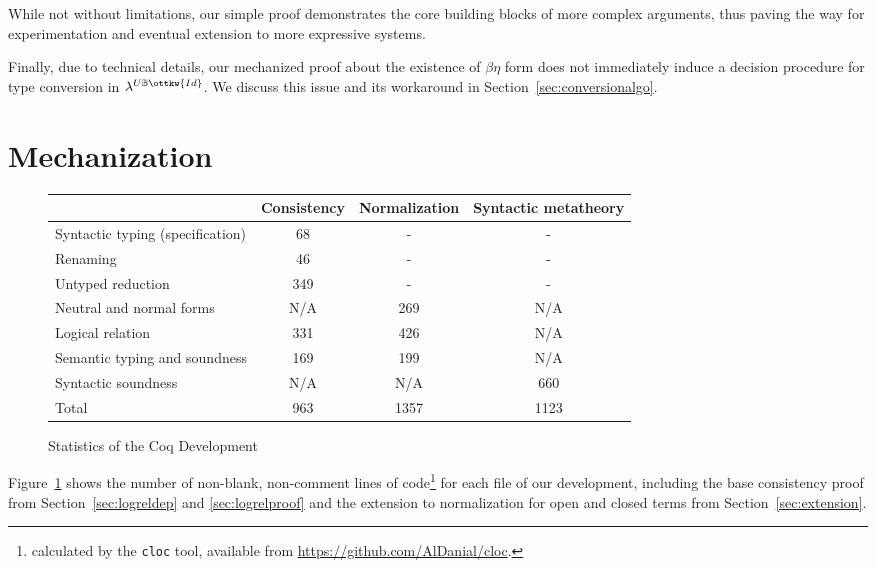 \documentclass[acmsmall,screen=true,
\ifpublic review=false\else,review=true\fi
  ,anonymous=\ifanonymous true\else false\fi]{acmart}
\newcommand{\lang}{$\lambda^{U\mathbb{B}\ottkw{Id}}$\xspace}
\newcommand{\scw}[1]{}
\begin{document}
While not without limitations, our simple proof demonstrates the core
building blocks of more complex arguments, thus paving the way for experimentation
and eventual extension to more expressive systems.\scw{I tried to reword your
sentence, but I am still not happy with it.}

\scw{Is this specific to $\eta$? Or is this also true for $\beta$? Can we move this
sentence elsewhere? I'd like to use the previous sentence as a conclusion for
this section.}
Finally, due to technical
details, our mechanized proof about the existence of $\beta\eta$ form does not
immediately induce a decision procedure for type conversion in
\lang{}. We discuss this issue and its workaround in
Section~\ref{sec:conversionalgo}.
\section{Mechanization}
\label{sec:logrelmech}
\begin{figure}[h]
  \begin{minipage}{0.9\textwidth}
  \begin{tabular}{ l |  c  | c | c }
    & Consistency & Normalization & Syntactic metatheory \\
    \hline
    Syntactic typing (specification) &  68 & - & - \\
    Renaming & 46 & -  & - \\
    Untyped reduction & 349 & - & - \\
    Neutral and normal forms & N/A & 269 & N/A \\
    Logical relation & 331 & 426 & N/A \\
    Semantic typing and soundness & 169 & 199 & N/A \\
    Syntactic soundness & N/A & N/A  & 660 \\
    \hline
    Total & 963 & 1357 & 1123 \\
  \end{tabular}
  \end{minipage}
  \caption{Statistics of the Coq Development}
  \label{fig:linecount}
\end{figure}

Figure~\ref{fig:linecount} shows the number of non-blank, non-comment lines of
code\footnote{calculated by the \texttt{cloc} tool, available from \url{https://github.com/AlDanial/cloc}.} for each file of our
development, including the base consistency proof from
Section~\ref{sec:logreldep} and \ref{sec:logrelproof} and the extension to
normalization for open and closed terms from Section~\ref{sec:extension}.
\end{document}
